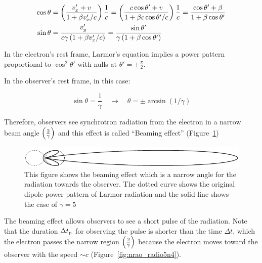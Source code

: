 \begin{equation}\label{eq:essential_radio5n50}
    \begin{aligned}
        \cos \theta &= \left(\frac{v_x^{\prime}+v}{1+\beta v_x^{\prime} / c}\right) \frac{1}{c}=\left(\frac{c \cos \theta^{\prime}+v}{1+\beta c \cos \theta^{\prime} / c}\right) \frac{1}{c}=\frac{\cos \theta^{\prime}+\beta}{1+\beta \cos \theta^{\prime}} \\
        \sin \theta &= \frac{v_y^{\prime}}{c \gamma\left(1+\beta v_{x}^{\prime} / c\right)} = \frac{\sin \theta^{\prime}}{\gamma\left(1+\beta \cos \theta^{\prime}\right)}
    \end{aligned}
\end{equation}

In the electron's rest frame, Larmor's equation implies a power pattern proportional to $\cos^2\theta'$ with nulls at $\theta'=\pm \frac{\pi}{2}$.

In the observer's rest frame, in this case:

\begin{equation}\label{eq:essential_radio5n52}
    \sin\theta = \frac{1}{\gamma} \quad \rightarrow \quad \theta=\pm \arcsin (1 / \gamma)
\end{equation}

Therefore, observers see synchrotron radiation from the electron in a narrow beam angle $\left(\frac{2}{\gamma}\right)$ and this effect is called ``Beaming effect'' (Figure~\ref{fig:nrao_radio5n3})

\begin{figure}[htbp]
	\centering
	\includegraphics[width=.7\linewidth]{Chapter_2/Figures/NRAO_radio5n3.png}
    \caption[The schematic picture of relativistic aberration]{\label{fig:nrao_radio5n3}
        This figure shows the beaming effect which is a narrow angle for the radiation towards the observer.
        The dotted curve shows the original dipole power pattern of Larmor radiation and the solid line shows the case of $\gamma = 5$
    }
\end{figure}

The beaming effect allows observers to see a short pulse of the radiation.
Note that the duration $\Delta t_{\mathrm{p}}$ for observing the pulse is shorter than the time $\Delta t$, which the electron passes the narrow region $\left(\frac{2}{\gamma}\right)$ because the electron moves toward the observer with the speed $\sim c$ (Figure~\ref{fig:nrao_radio5n4}).

